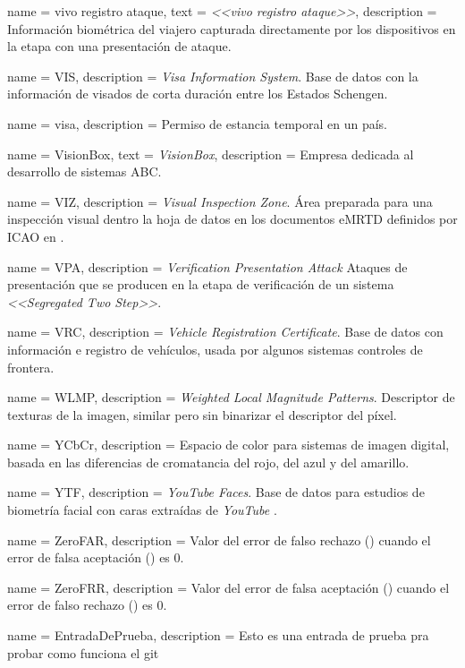 {
    name        = {vivo registro ataque},
    text        = {\textit{<<vivo registro ataque>>}},
    description = {Información biométrica del viajero capturada directamente por los dispositivos  en la etapa  con una presentación de ataque.}
}

{
    name        = VIS,
    description = {\textit{Visa Information System}. Base de datos con la información de visados de corta duración entre los Estados Schengen.}
}

{
    name        = {visa},
    description = {Permiso de estancia temporal en un país.}
}

{
    name        = {VisionBox},
    text        = {\textit{VisionBox}},
    description = {Empresa dedicada al desarrollo de sistemas ABC.}
}

{
    name        = {VIZ},
    description = {\textit{Visual Inspection Zone}. Área preparada para una inspección visual dentro la hoja de datos en los documentos \gls{eMRTD} definidos por \gls{ICAO} en \cite{doc20069303}.}
}

{
    name        = {VPA},
    description = {\textit{Verification Presentation Attack} Ataques de presentación que se producen en la etapa de verificación de un sistema  \textit{<<Segregated Two Step>>}.}
}

{
    name        = {VRC},
    description = {\textit{Vehicle Registration Certificate}. Base de datos con información e registro de vehículos, usada por algunos sistemas controles de frontera.}
}

{
    name        = {WLMP},
    description = {\textit{Weighted Local Magnitude Patterns}. Descriptor de texturas de la imagen, similar  pero sin binarizar el descriptor del píxel.}
}

{
    name        = {YCbCr},
    description = {Espacio de color para sistemas de imagen digital, basada en las diferencias de cromatancia del rojo, del azul y del amarillo.}
}

{
    name        = {YTF},
    description = {\textit{YouTube Faces}. Base de datos para estudios de biometría facial con caras extraídas de \textit{YouTube} \cite{wolf2011face}.}
}

{
    name        = {ZeroFAR},
    description = {Valor del error de falso rechazo () cuando el error de falsa aceptación () es $0$.}
}

{
    name        = {ZeroFRR},
    description = {Valor del error de falsa aceptación () cuando el error de falso rechazo () es $0$.}
}

{
    name        = {EntradaDePrueba},
    description = {Esto es una entrada de prueba pra probar como funciona el git}
}
